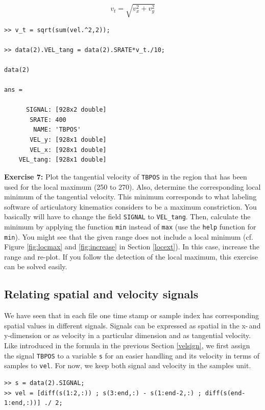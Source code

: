 \documentclass[a4paper, 12pt]{article}
\begin{document}
\begin{equation}
v_t = \sqrt{v_{x} ^ 2 + v_{y} ^ 2} \label{eq:tv}
\end{equation}



\begin{verbatim}
>> v_t = sqrt(sum(vel.^2,2));

>> data(2).VEL_tang = data(2).SRATE*v_t./10; 

data(2)

ans = 

      SIGNAL: [928x2 double]
       SRATE: 400
        NAME: 'TBPOS'
       VEL_y: [928x1 double]
       VEL_x: [928x1 double]
    VEL_tang: [928x1 double]
\end{verbatim}


\noindent\textbf{Exercise 7:} Plot the tangential velocity of \texttt{TBPOS} in the region that has been used for the local maximum (250 to 270). Also, determine the corresponding local minimum of the tangential velocity. This minimum corresponds to what labeling software of articulatory kinematics considers to be a maximum constriction. You basically will have to change the field \texttt{SIGNAL} to \texttt{VEL\_tang}. Then, calculate the minimum by applying the function \texttt{min} instead of \texttt{max} (use the \texttt{help} function for \texttt{min}). You might see that the given range does not include a local minimum (cf.\,Figure \ref{fig:locmax} and \ref{fig:increase} in Section \ref{locext}). In this case, increase the range and re-plot. If you follow the detection of the local maximum, this exercise can be solved easily.\par\smallskip


\subsection{Relating spatial and velocity signals}\label{relSpaVelSig}

We have seen that in each file one time stamp or sample index has corresponding spatial values in different signals. Signals can be expressed as spatial in the x-\,and y-dimension or as velocity in a particular dimension and as tangential velocity. Like introduced in the formula in the previous Section \ref{velsign}, we first assign the signal \texttt{TBPOS} to a variable \texttt{s} for an easier handling and its velocity in terms of samples to \texttt{vel}. For now, we keep both signal and velocity in the samples unit.


\begin{verbatim}
>> s = data(2).SIGNAL;
>> vel = [diff(s(1:2,:)) ; s(3:end,:) - s(1:end-2,:) ; diff(s(end-1:end,:))] ./ 2;
\end{verbatim}
\end{document}
